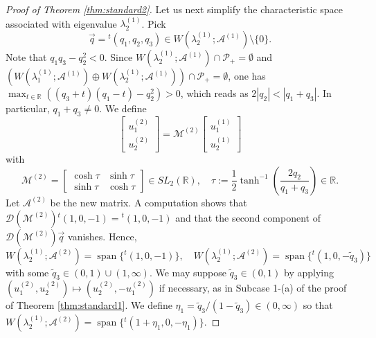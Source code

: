 \documentclass[11pt,a4paper,twosides]{amsart}
\theoremstyle{plain}
\theoremstyle{remark}
\numberwithin{equation}{section}
\newcommand{\R}{\mathbb{R}}
\def\({\left(}
\def\){\right)}
\DeclareMathOperator{\Span}{span}
\theoremstyle{definition}
\newcommand{\1}{{\bf 1}_{\{|x| < |t|\}}}
\renewcommand{\tilde}{\widetilde}
\begin{document}
\begin{proof}[Proof of Theorem \ref{thm:standard2}]
Let us next simplify the characteristic space associated with eigenvalue $\lambda_2^{(1)}$.
Pick
\[
	\vec{q} = {}^t\!(q_1,q_2,q_3) \in W(\lambda_2^{(1)};\mathscr{A}^{(1)})
	\setminus\{0\}.
\]
Note that $q_1q_3-q_2^2<0$.
Since $W(\lambda_2^{(1)};\mathscr{A}^{(1)}) \cap \mathcal{P}_+ = \emptyset$
and $(W(\lambda_1^{(1)};\mathscr{A}^{(1)})\oplus W(\lambda_2^{(1)};\mathscr{A}^{(1)})) \cap \mathcal{P}_+ = \emptyset$, one has
$\max_{t\in\R} ((q_3+t)(q_1-t)-q_2^2)>0$,
which reads as $2|q_2|<|q_1+q_3|$.
In particular, $q_1+q_3\neq0$.
We define
\[
	\begin{bmatrix}
	u_1^{(2)}\\
	u_2^{(2)}
	\end{bmatrix}
	=
	\mathscr{M}^{(2)}
	\begin{bmatrix}
	u_1^{(1)}\\
	u_2^{(1)}
	\end{bmatrix}
\]
with
\[
	\mathscr{M}^{(2)}=\begin{bmatrix}
	\cosh \tau & \sinh \tau  \\
	\sinh \tau & \cosh \tau
	\end{bmatrix} \in SL_2(\R), \quad 
	\tau := \frac12 \tanh^{-1} \( \frac{2q_2}{q_1+q_3} \)\in \R.
\]
Let $\mathscr{A}^{(2)}$ be the new matrix.
A computation shows that
$\mathscr{D}(\mathscr{M}^{(2)}){}^t\!(1,0,-1)={}^t\!(1,0,-1)$ and that
the second component of $\mathscr{D}(\mathscr{M}^{(2)})\vec{q}$ vanishes. Hence,
\[
	W(\lambda_2^{(1)};\mathscr{A}^{(2)})=\Span\{{}^t\!(1,0,-1)\}, \quad
	W(\lambda_2^{(1)};\mathscr{A}^{(2)})=\Span \{ {}^t\!(1,0, -\tilde{q}_3) \}
\]
with some $\tilde{q}_3\in (0,1)\cup (1,\infty)$.
We may suppose $\tilde{q}_3\in (0,1)$ by applying $(	u_1^{(2)},	u_2^{(2)})
\mapsto (	u_2^{(2)},	-u_1^{(2)})$ if necessary,
as in Subcase 1-(a) of the proof of Theorem \ref{thm:standard1}.
We define $\eta_1=\tilde{q}_3/(1-\tilde{q}_3)\in(0,\infty)$ so that
$W(\lambda_2^{(1)};\mathscr{A}^{(2)})=\Span \{ {}^t\!(1+\eta_1,0, -\eta_1) \}$.


\end{proof}
\end{document}
